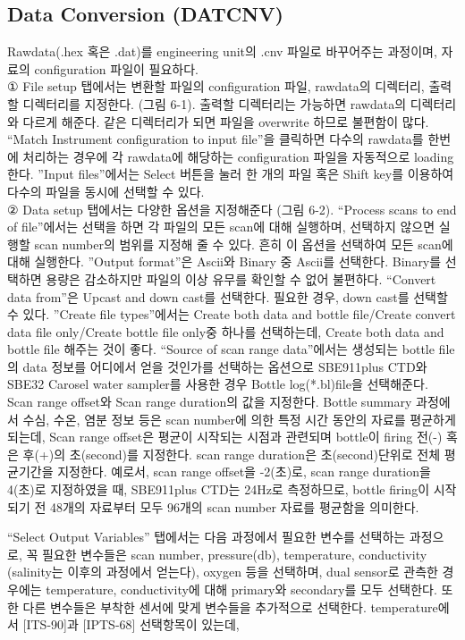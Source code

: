\documentclass[
]{book}
\begin{document}
\hypertarget{data-conversion-datcnv}{%
\subsection{Data Conversion (DATCNV)}\label{data-conversion-datcnv}}

Rawdata(.hex 혹은 .dat)를 engineering unit의 .cnv 파일로 바꾸어주는 과정이며, 자료의 configuration 파일이 필요하다.\\
① File setup 탭에서는 변환할 파일의 configuration 파일, rawdata의 디렉터리, 출력할 디렉터리를 지정한다. (그림 6-1). 출력할 디렉터리는 가능하면 rawdata의 디렉터리와 다르게 해준다. 같은 디렉터리가 되면 파일을 overwrite 하므로 불편함이 많다. ``Match Instrument configuration to input file''을 클릭하면 다수의 rawdata를 한번에 처리하는 경우에 각 rawdata에 해당하는 configuration 파일을 자동적으로 loading 한다. ''Input files''에서는 Select 버튼을 눌러 한 개의 파일 혹은 Shift key를 이용하여 다수의 파일을 동시에 선택할 수 있다.\\
② Data setup 탭에서는 다양한 옵션을 지정해준다 (그림 6-2). ``Process scans to end of file''에서는 선택을 하면 각 파일의 모든 scan에 대해 실행하며, 선택하지 않으면 실행할 scan number의 범위를 지정해 줄 수 있다. 흔히 이 옵션을 선택하여 모든 scan에 대해 실행한다. ''Output format''은 Ascii와 Binary 중 Ascii를 선택한다. Binary를 선택하면 용량은 감소하지만 파일의 이상 유무를 확인할 수 없어 불편하다.
``Convert data from''은 Upcast and down cast를 선택한다. 필요한 경우, down cast를 선택할 수 있다. ''Create file types''에서는 Create both data and bottle file/Create convert data file only/Create bottle file only중 하나를 선택하는데, Create both data and bottle file 해주는 것이 좋다.
``Source of scan range data''에서는 생성되는 bottle file의 data 정보를 어디에서 얻을 것인가를 선택하는 옵션으로 SBE911plus CTD와 SBE32 Carosel water sampler를 사용한 경우 Bottle log(*.bl)file을 선택해준다. Scan range offset와 Scan range duration의 값을 지정한다. Bottle summary 과정에서 수심, 수온, 염분 정보 등은 scan number에 의한 특정 시간 동안의 자료를 평균하게 되는데, Scan range offset은 평균이 시작되는 시점과 관련되며 bottle이 firing 전(-) 혹은 후(+)의 초(second)를 지정한다. scan range duration은 초(second)단위로 전체 평균기간을 지정한다. 예로서, scan range offset을 -2(초)로, scan range duration을 4(초)로 지정하였을 때, SBE911plus CTD는 24Hz로 측정하므로, bottle firing이 시작되기 전 48개의 자료부터 모두 96개의 scan number 자료를 평균함을 의미한다.

``Select Output Variables'' 탭에서는 다음 과정에서 필요한 변수를 선택하는 과정으로, 꼭 필요한 변수들은 scan number, pressure(db), temperature, conductivity (salinity는 이후의 과정에서 얻는다), oxygen 등을 선택하며, dual sensor로 관측한 경우에는 temperature, conductivity에 대해 primary와 secondary를 모두 선택한다. 또한 다른 변수들은 부착한 센서에 맞게 변수들을 추가적으로 선택한다. temperature에서 {[}ITS-90{]}과 {[}IPTS-68{]} 선택항목이 있는데,
\end{document}
